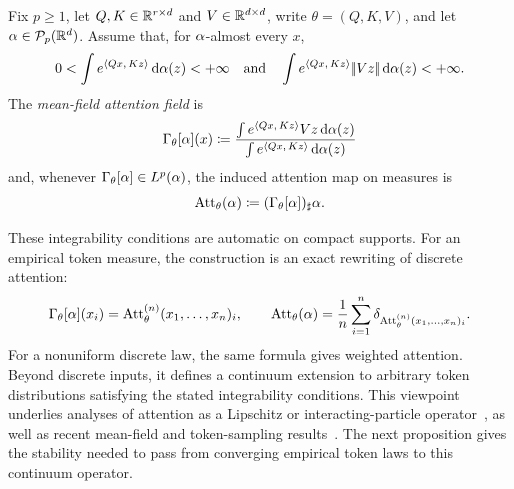 \begin{defn}\label{def-mean-field-attention-map}
	Fix \(p\geq1\), let $Q,K\in\mathbb{R}^{r\times d}$ and $V\in\mathbb{R}^{d\times d}$, write \(\theta=(Q,K,V)\), and let \(\alpha\in\mathcal{P}_p(\mathbb{R}^d)\). Assume that, for \(\alpha\)-almost every \(x\),
	\[
		0<\int e^{\langle Qx,\,Kz\rangle}\,\mathrm{d}\alpha(z)<+\infty
		\quad \text{and} \quad
		\int e^{\langle Qx,\,Kz\rangle}|\!| Vz |\!|\,\mathrm{d}\alpha(z)<+\infty.
	\]
	The \emph{mean-field attention field} is
	\begin{equation}\label{eq-mean-field-attention}
		\Gamma_\theta[\alpha](x)
		\coloneqq
		\frac{\int e^{\langle Qx,\,Kz\rangle}Vz\,\mathrm{d}\alpha(z)}
		{\int e^{\langle Qx,\,Kz\rangle}\,\mathrm{d}\alpha(z)}
	\end{equation}
	and, whenever \(\Gamma_\theta[\alpha]\in L^p(\alpha)\), the induced attention map on measures is
	\[
		\operatorname{Att}_\theta(\alpha)
		\coloneqq
		(\Gamma_\theta[\alpha])_\sharp\alpha.
	\]
\end{defn}
These integrability conditions are automatic on compact supports. For an empirical token measure, the construction is an exact rewriting of discrete attention:
\[
	\Gamma_\theta[\alpha](x_i)
	=
	\operatorname{Att}^{(n)}_\theta(x_1,\ldots,x_n)_i,
	\qquad
	\operatorname{Att}_\theta(\alpha)
	=
	\frac1n\sum_{i=1}^n
	\delta_{\operatorname{Att}^{(n)}_\theta(x_1,\ldots,x_n)_i}.
\]
For a nonuniform discrete law, the same formula gives weighted attention. Beyond discrete inputs, it defines a continuum extension to arbitrary token distributions satisfying the stated integrability conditions. This viewpoint underlies analyses of attention as a Lipschitz or interacting-particle operator~\cite{Vuckovic2020MathematicalAttention,Geshkovski2023MathematicalPerspective}, as well as recent mean-field and token-sampling results~\cite{Castin2025DynamicsTransformers,Bohbot2025TokenSampleComplexity}. The next proposition gives the stability needed to pass from converging empirical token laws to this continuum operator.

